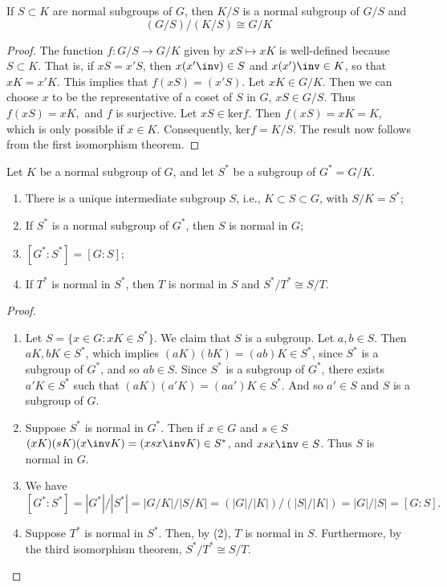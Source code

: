 \documentclass[11pt]{scrartcl}
\begin{document}
\begin{theorem}
    If $S \subset K$ are normal subgroups of $G$, then $K/S$ is a normal subgroup of $G/S$ and $$(G/S)/(K/S) \cong G/K$$
\end{theorem} 
\begin{proof}
    The function  $f: G/S \to G/K$ given by $xS \mapsto xK$ is well-defined because $S \subset K$. That is, if $xS = x'S$, then $x(x'\inv) \in S$ and $x(x')\inv \in K$, so that $xK = x'K$. This implies that $f(xS)=(x'S).$
    Let $xK \in G/K$. Then we can choose $x$ to be the representative of a coset of $S$ in $G$, $xS\in G/S$. Thus $f(xS) = xK,$ and $f$ is surjective. Let $xS \in \text{ker}f$. Then $f(xS) = xK = K$, which is only possible if $x \in K$. Consequently, ker$f = K/S$. The result now follows from the first isomorphism theorem.
\end{proof}
\begin{theorem}
   Let $K$ be a normal subgroup of $G$, and let $S^*$ be a subgroup of $G^* = G/K$.
   \begin{enumerate}
       \item There is a unique intermediate subgroup $S$, i.e., $K \subset S \subset G$, with $S/K = S^*$;
       \item If $S^*$ is a normal subgroup of $G^*$, then $S$ is normal in $G$;
       \item $[G^*:S^*] = [G:S]$;
       \item If $T^*$ is normal in $S^*$, then $T$ is normal in $S$ and $S^* / T^* \cong S/T$.
       
   \end{enumerate}
\end{theorem}
\begin{proof}
    \begin{enumerate}
        \item Let $S = \{x \in G : xK \in S^*\}$. We claim that $S$ is a subgroup. Let $a,b \in S$. Then $aK, bK \in S^*$, which implies $(aK)(bK) = (ab)K \in S^*$, since $S^*$ is a subgroup of $G^*$, and so $ab \in S$. Since $S^*$ is a subgroup of $G^*$, there exists $a'K \in S^*$ such that $(aK)(a'K) = (aa')K \in S^*$. And so $a' \in S$ and $S$ is a subgroup of $G$.
        \item  Suppose $S^*$ is normal in $G^*$. Then if $x\in G$ and $s \in S$ $(xK)(sK)(x\inv K) = (xsx\inv K) \in S^*$, and $xsx\inv \in S$. Thus $S$ is normal in $G$.
        \item We have $$[G^*:S^*] = |G^*|/|S^*| =|G/K|/|S/K| = (|G|/|K|)/(|S|/|K|)=|G|/|S| = [G:S].$$
        \item Suppose $T^*$ is normal in $S^*$. Then, by (2), $T$ is normal in $S$. Furthermore, by the third isomorphism theorem, $S^*/T^* \cong S/T$. 
    \end{enumerate}
\end{proof}
\end{document}
